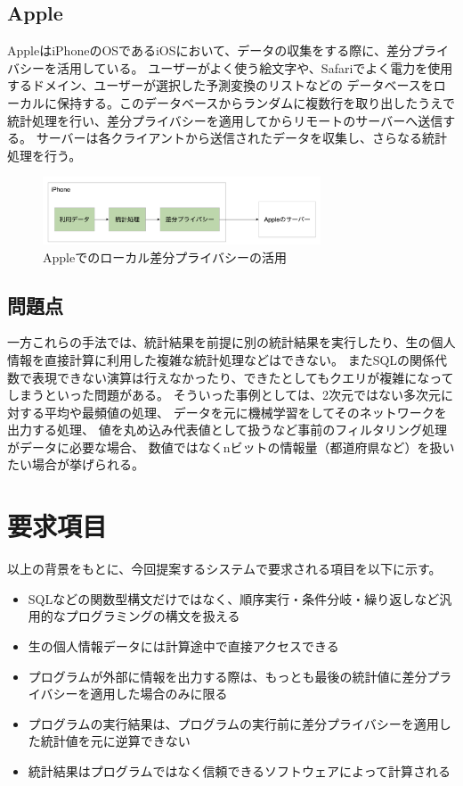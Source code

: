 \documentclass[a4paper,11pt]{jreport}
\begin{document}
\subsection{Apple}

AppleはiPhoneのOSであるiOSにおいて、データの収集をする際に、差分プライバシーを活用している。\cite{apple}
ユーザーがよく使う絵文字や、Safariでよく電力を使用するドメイン、ユーザーが選択した予測変換のリストなどの
データベースをローカルに保持する。このデータベースからランダムに複数行を取り出したうえで
統計処理を行い、差分プライバシーを適用してからリモートのサーバーへ送信する。
サーバーは各クライアントから送信されたデータを収集し、さらなる統計処理を行う。

\begin{figure}[htbp]
    \centering
\includegraphics[height=20mm]{apple.png}
    \caption{Appleでのローカル差分プライバシーの活用}
    \label{fig:apple}
\end{figure}

\subsection{問題点}

一方これらの手法では、統計結果を前提に別の統計結果を実行したり、生の個人情報を直接計算に利用した複雑な統計処理などはできない。
またSQLの関係代数で表現できない演算は行えなかったり、できたとしてもクエリが複雑になってしまうといった問題がある。
そういった事例としては、2次元ではない多次元に対する平均や最頻値の処理、
データを元に機械学習をしてそのネットワークを出力する処理、
値を丸め込み代表値として扱うなど事前のフィルタリング処理がデータに必要な場合、
数値ではなくnビットの情報量（都道府県など）を扱いたい場合が挙げられる。

\section{要求項目}

以上の背景をもとに、今回提案するシステムで要求される項目を以下に示す。
\begin{itemize}
    \item SQLなどの関数型構文だけではなく、順序実行・条件分岐・繰り返しなど汎用的なプログラミングの構文を扱える
    \item 生の個人情報データには計算途中で直接アクセスできる
    \item プログラムが外部に情報を出力する際は、もっとも最後の統計値に差分プライバシーを適用した場合のみに限る
    \item プログラムの実行結果は、プログラムの実行前に差分プライバシーを適用した統計値を元に逆算できない
    \item 統計結果はプログラムではなく信頼できるソフトウェアによって計算される
\end{itemize}
\end{document}
